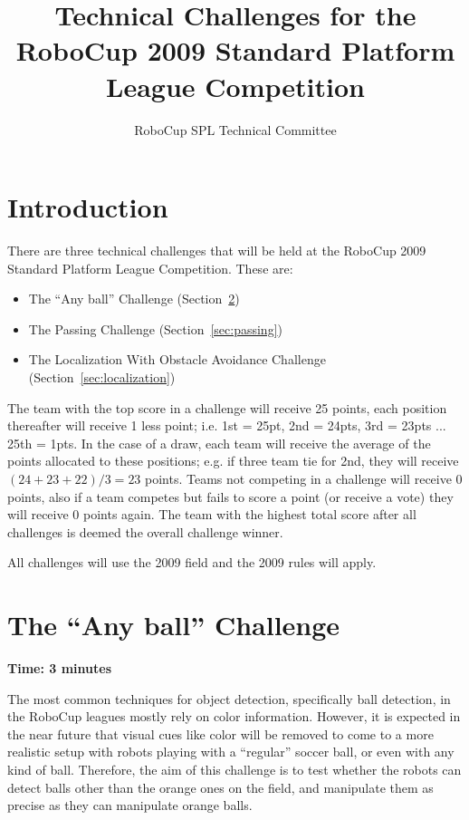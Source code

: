 \documentclass{article}
\begin{document}
\title{Technical Challenges for the RoboCup 2009 Standard Platform League Competition}

\author{RoboCup SPL Technical Committee}

\maketitle

\section{Introduction}

There are three technical challenges that will be held at the RoboCup 2009 Standard Platform League Competition. These are:

\begin{itemize}
\item The ``Any ball'' Challenge (Section~\ref{sec:anyball})
\item The Passing Challenge (Section~\ref{sec:passing})
\item The Localization With Obstacle Avoidance Challenge (Section~\ref{sec:localization})
\end{itemize}

The team with the top score in a challenge will receive 25 points, each position thereafter will receive 1 less point; i.e. 1st = 25pt, 2nd = 24pts, 3rd = 23pts ... 25th = 1pts. In the case of a draw, each team will receive the average of the points allocated to these positions; e.g. if three team tie for 2nd, they will receive $(24+23+22)/3 = 23$ points. Teams not competing in a challenge will receive 0 points, also if a team competes but fails to score a point (or receive a vote) they will receive 0 points again. The team with the highest total score after all challenges is deemed the overall challenge winner.

All challenges will use the 2009 field and the 2009 rules will apply.

\newpage
\section{The ``Any ball'' Challenge}
\label{sec:anyball}

\textbf{Time: 3 minutes}

The most common techniques for object detection, specifically ball detection, in the RoboCup leagues mostly rely on color information. However, it is expected in the near future that visual cues like color will be removed to come to a more realistic setup with robots playing with a ``regular'' soccer ball, or even with any kind of ball. Therefore, the aim of this challenge is to test whether the robots can detect balls other than the orange ones on the field, and manipulate them as precise as they can manipulate orange balls.
\end{document}
